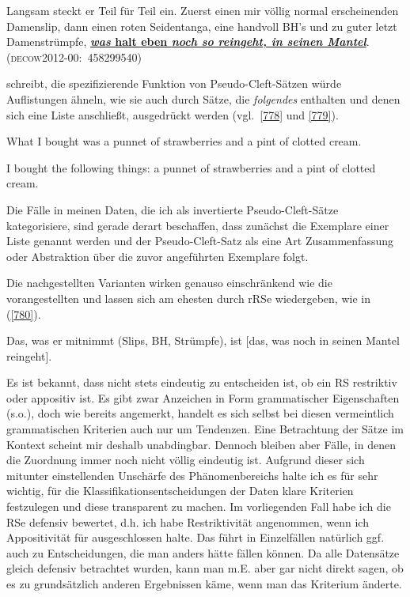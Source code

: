\begin{exe}
	\ex\label{777} 

	Langsam steckt er Teil für Teil ein. Zuerst einen mir völlig normal erscheinenden Damenslip, dann einen roten Seidentanga, eine handvoll BH's und zu guter letzt Damenstrümpfe, \ul{\textbf{\textit{was} halt eben \textit{noch so reingeht, in seinen Mantel}}}. 
	\hfill\hbox{\scshape(decow2012-00: 458299540)}
\end{exe}
\citet[95]{Higgins1976} schreibt, die spezifizierende Funktion von Pseudo-Cleft-Sätzen würde Auflistungen ähneln, wie sie auch durch Sätze, die \textit{folgendes} ent\-halten und denen sich eine Liste anschließt, ausgedrückt werden (vgl.\ \ref{778} und \ref{779}).
	
\begin{exe}
	\ex\label{778} 
	What I bought was a punnet of strawberries and a pint of clotted cream.
\end{exe}	
	
\begin{exe}
	\ex\label{779} 
	I bought the following things: a punnet of strawberries and a pint of clotted cream.
\end{exe}	
Die Fälle in meinen Daten, die ich als invertierte Pseudo-Cleft-Sätze kategorisiere, sind gerade derart beschaffen, dass zunächst die Exemplare einer Liste genannt werden und der Pseudo-Cleft-Satz als eine Art Zusammenfassung oder Abstraktion über die zuvor angeführten Exemplare folgt. 

Die nachgestellten Varianten wirken genauso einschränkend wie die vorange\-stellten und lassen sich am ehesten durch rRSe wiedergeben, wie in (\ref{780}).

\begin{exe}
	\ex\label{780} 
	Das, was er mitnimmt (Slips, BH, Strümpfe), ist [das, was noch in seinen Mantel reingeht].
\end{exe}
Es ist bekannt, dass nicht stets eindeutig zu entscheiden ist, ob ein RS restriktiv oder appositiv ist. Es gibt zwar Anzeichen in Form grammatischer Eigenschaften (s.o.), doch wie bereits angemerkt, handelt es sich selbst bei diesen vermeintlich  grammatischen Kriterien auch nur um Tendenzen. Eine Betrachtung der Sätze im Kontext scheint mir deshalb unabdingbar. Dennoch bleiben aber Fälle, in denen die Zuordnung immer noch nicht völlig eindeutig ist. Aufgrund dieser sich mitunter einstellenden Unschärfe des Phänomenbereichs halte ich es für sehr wichtig, für die Klassifikationsentscheidungen der Daten klare Kriterien festzulegen und diese transparent zu machen. Im vorliegenden Fall habe ich die RSe defensiv bewertet, d.h. ich habe Restriktivität angenommen, wenn ich Appositivität für ausge\-schlossen halte. Das führt in Einzelfällen natürlich ggf. auch zu Entscheidungen, die man anders hätte fällen können. Da alle Datensätze \\ gleich defensiv betrachtet wurden, kann man m.E. aber gar nicht direkt sagen, ob es zu grundsätzlich anderen Ergebnissen käme, wenn man das Kriterium änderte.

